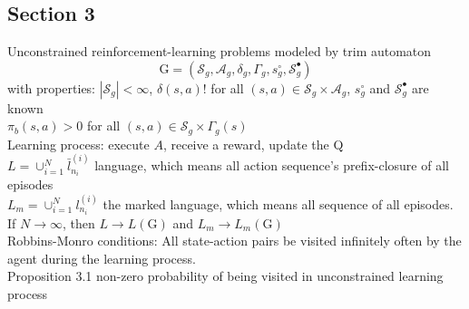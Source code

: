 \documentclass{article}
\begin{document}
\subsection{Section 3}
Unconstrained reinforcement-learning problems modeled by trim automaton$$
\mathrm{G}=(\mathcal{S}_g,\mathcal{A}_g,\delta_g,\Gamma_g,s_g^\circ,\mathcal{S}_g^\bullet)
$$
with properties: $|\mathcal{S}_g|<\infty$, $\delta(s,a)!$ for all $(s,a)\in\mathcal{S}_g\times \mathcal{A}_g$, $s_g^{\circ}$ and $\mathcal{S}_g^{\bullet}$ are known\\
$\pi_b(s,a)>0$ for all $(s,a)\in \mathcal{S}_g \times \Gamma_{g}(s)$\\
Learning process: execute $A$, receive a reward, update the Q\\
$L=\cup_{i=1}^N\bar{l}_{n_i}^{(i)}$ \quad language, which means all action sequence's prefix-closure of all episodes\\
$L_m=\cup_{i=1}^N {l}_{n_i}^{(i)}$ \quad the marked language, which means all sequence of all episodes.\\
If $N \rightarrow \infty$, then $L \rightarrow L(\mathrm{G})$ and $L_m \rightarrow L_m(\mathrm{G})$\\
Robbins-Monro conditions: All state-action pairs be visited infinitely often by the agent during the learning process.\\
Proposition 3.1 non-zero probability of being visited in unconstrained learning process\\
\end{document}
